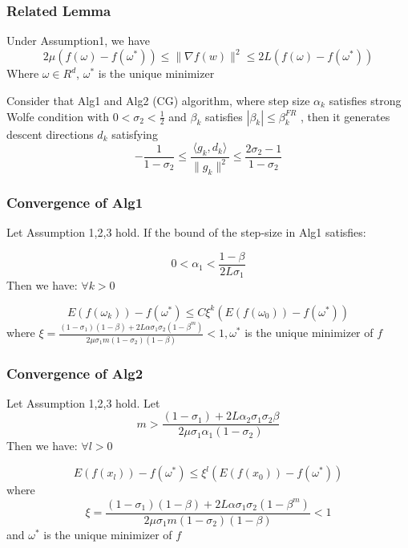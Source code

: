 \documentclass{beamer}
\begin{document}
\begin{frame}
		\frametitle{\bf Related Lemma} 
	\begin{lemma}  
		Under Assumption1, we have
		\begin{equation}
			2\mu(f(\omega)-f(\omega^*)) \leq \|\nabla f(w)\|^2 \leq 2L(f(\omega)-f(\omega^*))
			\label{4:lemma_1_formula}
		\end{equation}
		Where $\omega \in R^d$, $\omega^*$ is the unique minimizer
	\end{lemma}
	\begin{lemma} 
		Consider that Alg1 and Alg2 (CG) algorithm, where step size $\alpha_k$ satisfies strong Wolfe condition with $0 < \sigma_2 < \frac{1}{2}$ and $\beta_k$  satisfies $|\beta_k| \leq \beta_k^{FR}$ , then it generates descent directions $d_k$ satisfying
		\begin{equation}
			-\frac{1}{1-\sigma_2} \leq \frac{\langle g_k,d_k \rangle}{\|g_k\|^2} \leq \frac{2\sigma_2-1}{1-\sigma_2}
			\label{4:lemma_2_formula}
		\end{equation} 
	\end{lemma}
\end{frame}
\begin{frame}
	\frametitle{\bf Convergence of Alg1} 
\begin{theorem}  
	Let Assumption 1,2,3 hold. If the bound of the step-size in Alg1 satisfies:
	
	\begin{equation}
		0 < \alpha_1 < \frac{1-\beta}{2L\sigma_1}
		\label{4:alpha_between}
	\end{equation} 
	Then we have:  $\forall k>0$
	
	\begin{equation}
		E(f(\omega_k))-f({\omega^*}) \leq C\xi^k (E(f(\omega_0))-f(\omega^*))
		\label{4:theorem_concludtion}
	\end{equation} 
	where $\xi = \frac{(1-\sigma_1)(1-\beta)+2L\alpha\sigma_1\sigma_2(1-\beta^m)}{2\mu\sigma_1m(1-\sigma_2)(1-\beta)}<1, \omega^*$ is the unique minimizer of $f$
\end{theorem}
\end{frame}

\begin{frame}
	\frametitle{\bf Convergence of Alg2} 
\begin{theorem}
	Let Assumption 1,2,3 hold. Let $$m>\frac{(1-\sigma_1)+2L\alpha_2\sigma_1\sigma_2\beta}{2\mu\sigma_1\alpha_1(1-\sigma_2)}$$
	Then we have:  $\forall l>0$
	
	\begin{equation}
		E(f(x_l))-f({\omega^*}) \leq \xi^l (E(f(x_0))-f(\omega^*))
		\label{4:theorem2_conludtion}
	\end{equation} 
	where $$\xi = \frac{(1-\sigma_1)(1-\beta)+2L\alpha\sigma_1\sigma_2(1-\beta^m)}{2\mu\sigma_1m(1-\sigma_2)(1-\beta)}<1$$ and $ \omega^*$   is the unique minimizer of $f$
\end{theorem}
\end{frame}
\end{document}
